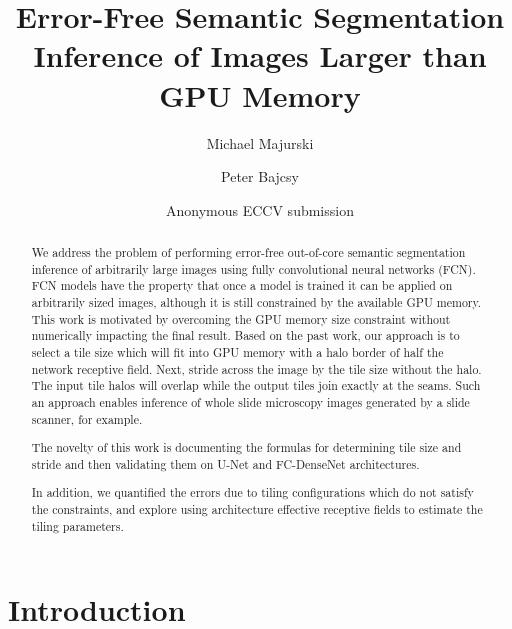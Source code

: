 \documentclass[runningheads]{llncs}
\title{Error-Free Semantic Segmentation Inference of Images Larger than GPU Memory}
\author{Michael Majurski\inst{1} \and Peter Bajcsy\inst{1}}
\institute{National Institute of Standards and Technology\\
	Information Technology Lab\\
	Gaithersburg, MD 20899, USA\\
	\email{\{michael.majurski,peter.bajcsy\}@nist.gov}}
\author{Anonymous ECCV submission}
\institute{Paper ID \ECCVSubNumber}
\begin{document}
\maketitle
 
\begin{abstract}

We address the problem of performing error-free out-of-core semantic segmentation inference of arbitrarily large images using fully convolutional neural networks (FCN). FCN models have the property that once a model is trained it can be applied on arbitrarily sized images, although it is still constrained by the available GPU memory. This work is motivated by overcoming the GPU memory size constraint without numerically impacting the final result. 
Based on the past work, our approach is to select a tile size which will fit into GPU memory with a halo border of half the network receptive field. Next, stride across the image by the tile size without the halo. The input tile halos will overlap while the output tiles join exactly at the seams. Such an approach enables inference of whole slide microscopy images generated by a slide scanner, for example.

The novelty of this work is documenting the formulas for determining tile size and stride and then validating them on U-Net and FC-DenseNet architectures.

In addition, we quantified the errors due to tiling configurations which do not satisfy the constraints, and explore using architecture effective receptive fields to estimate the tiling parameters. 


\end{abstract}

\section{Introduction}
\end{document}
